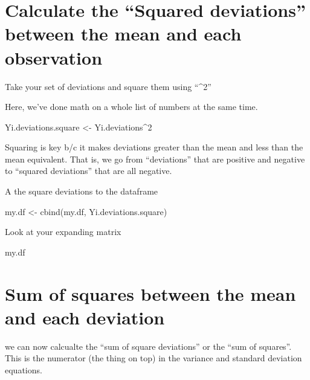 \documentclass[
]{book}
\newenvironment{Shaded}{\begin{snugshade}}{\end{snugshade}}
\newcommand{\DecValTok}[1]{\textcolor[rgb]{0.00,0.00,0.81}{#1}}
\newcommand{\FunctionTok}[1]{\textcolor[rgb]{0.00,0.00,0.00}{#1}}
\newcommand{\NormalTok}[1]{#1}
\newcommand{\OtherTok}[1]{\textcolor[rgb]{0.56,0.35,0.01}{#1}}
\newcommand{\SpecialCharTok}[1]{\textcolor[rgb]{0.00,0.00,0.00}{#1}}
\begin{document}
\hypertarget{calculate-the-squared-deviations-between-the-mean-and-each-observation}{%
\chapter{Calculate the ``Squared deviations'' between the mean and each observation}\label{calculate-the-squared-deviations-between-the-mean-and-each-observation}}

Take your set of deviations and square them using ``\^{}2''

Here, we've done math on a whole list of numbers at the same time.

\begin{Shaded}
\begin{Highlighting}[]
\NormalTok{Yi.deviations.square }\OtherTok{\textless{}{-}}\NormalTok{ Yi.deviations}\SpecialCharTok{\^{}}\DecValTok{2}
\end{Highlighting}
\end{Shaded}

Squaring is key b/c it makes deviations greater than the mean and less than the mean equivalent. That is, we go from ``deviations'' that are positive and negative to ``squared deviations'' that are all negative.

A the square deviations to the dataframe

\begin{Shaded}
\begin{Highlighting}[]
\NormalTok{my.df }\OtherTok{\textless{}{-}} \FunctionTok{cbind}\NormalTok{(my.df, Yi.deviations.square)}
\end{Highlighting}
\end{Shaded}

Look at your expanding matrix

\begin{Shaded}
\begin{Highlighting}[]
\NormalTok{my.df}
\end{Highlighting}
\end{Shaded}

\hypertarget{sum-of-squares-between-the-mean-and-each-deviation}{%
\chapter{Sum of squares between the mean and each deviation}\label{sum-of-squares-between-the-mean-and-each-deviation}}

we can now calcualte the ``sum of square deviations'' or the ``sum of squares''. This is the numerator (the thing on top) in the variance and standard deviation equations.
\end{document}
